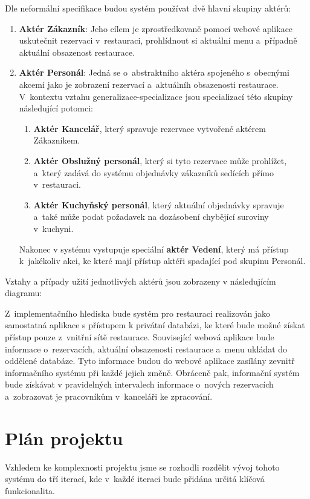 \documentclass[a4paper,10pt]{article}
\begin{document}
Dle neformální specifikace budou systém používat dvě hlavní skupiny aktérů:
\begin{enumerate}
\item \textbf{Aktér Zákazník}:
Jeho cílem je zprostředkovaně pomocí webové aplikace uskutečnit rezervaci v~restauraci, prohlídnout si aktuální menu a~případně aktuální obsazenost restaurace.
\item \textbf{Aktér Personál}:
Jedná se o~abstraktního aktéra spojeného s~obecnými akcemi jako je zobrazení rezervací a~aktuálníh obsazenosti restaurace. V~kontextu vztahu generalizace-specializace jsou specializací této skupiny následující potomci:
\begin{enumerate}
\item  \textbf{Aktér Kancelář}, který spravuje rezervace vytvořené aktérem Zákazníkem.
\item  \textbf{Aktér Obslužný personál}, který si tyto rezervace může prohlížet, a~který zadává do systému objednávky zákazníků sedících přímo v~restauraci.
\item  \textbf{Aktér Kuchyňský personál}, který aktuální objednávky spravuje a~také může podat požadavek na dozásobení chybějící suroviny v~kuchyni.
\end{enumerate}
Nakonec v systému vystupuje speciální \textbf{aktér Vedení}, který má přístup k~jakékoliv akci, ke které mají přístup aktéři spadající pod skupinu Personál.
\end{enumerate}

Vztahy a případy užití jednotlivých aktérů jsou zobrazeny v následujícím diagramu:

Z~implementačního hlediska bude systém pro restauraci realizován jako samostatná aplikace s přístupem k privátní databázi, ke které bude možné získat přístup pouze z~vnitřní sítě restaurace. Související webová aplikace bude informace o~rezervacích, aktuální obsazenosti restaurace a~menu ukládat do oddělené databáze. Tyto informace budou do webové aplikace zasílány zevnitř informačního systému při každé jejich změně. Obráceně pak, informační systém bude získávat v pravidelných intervalech informace o~nových rezervacích a~zobrazovat je pracovníkům v~kanceláři ke zpracování.

\section*{Plán projektu}

Vzhledem ke komplexnosti projektu jsme se rozhodli rozdělit vývoj tohoto systému do tří iterací, kde v~každé iteraci bude přidána určitá klíčová funkcionalita.
\end{document}
